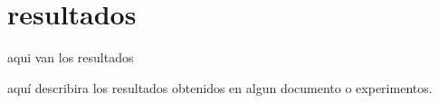 \section{resultados}

aqui van los resultados

aquí describira los resultados obtenidos en algun documento o experimentos.
